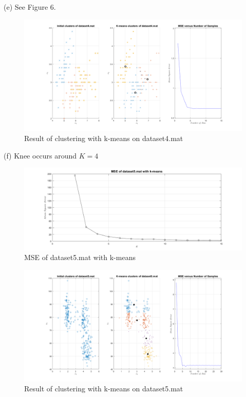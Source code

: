 \documentclass[12pt]{article}
\begin{document}
\noindent(e) See Figure 6.


\begin{figure}[H]
\centering
\includegraphics[width = 1\textwidth]{ds4.png}
\caption{Result of clustering with k-means on dataset4.mat}
\end{figure}

\vfill
\clearpage
(f) Knee occurs around $K = 4$

\begin{figure}[H]
\centering
\includegraphics[width = 1\textwidth]{ds5.png}
\caption{MSE of dataset5.mat with k-means}
\end{figure}

\begin{figure}[H]
\centering
\includegraphics[width = 1\textwidth]{ds52.png}
\caption{Result of clustering with k-means on dataset5.mat}
\end{figure}
\end{document}
